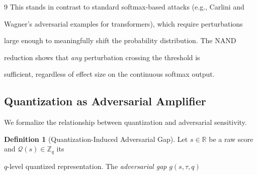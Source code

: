 \documentclass[11pt]{article}
\theoremstyle{definition}
\newtheorem{definition}[theorem]{Definition}
\begin{document}
\begin{thebibliography}{9}
This stands in contrast to standard softmax-based attacks (e.g., Carlini and






Wagner's adversarial examples for transformers), which require perturbations






large enough to meaningfully shift the probability distribution.  The NAND






reduction shows that \emph{any} perturbation crossing the threshold is






sufficient, regardless of effect size on the continuous softmax output.













\subsection{Quantization as Adversarial Amplifier}













We formalize the relationship between quantization and adversarial sensitivity.













\begin{definition}[Quantization-Induced Adversarial Gap]






Let $s \in \mathbb{R}$ be a raw score and $\mathcal{Q}(s) \in \mathbb{Z}_q$ its






$q$-level quantized representation.  The \emph{adversarial gap} $g(s, \tau, q)$







\end{definition}
\end{thebibliography}
\end{document}

